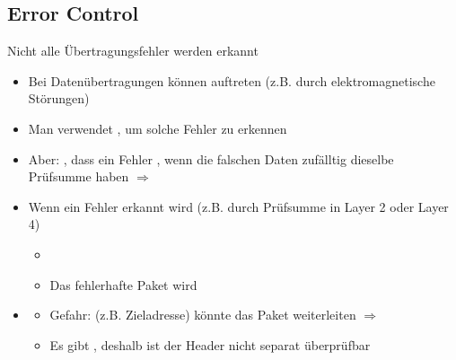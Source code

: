 \subsection{Error Control}
 Nicht alle Übertragungsfehler werden erkannt
\begin{itemize}
    \item Bei Datenübertragungen können  auftreten (z.B. durch elektromagnetische Störungen)
    \item Man verwendet , um solche Fehler zu erkennen
    \item Aber: , dass ein Fehler , wenn die falschen Daten zufälltig dieselbe Prüfsumme haben $\Rightarrow$ 
\end{itemize}
\begin{itemize}
    \item Wenn ein Fehler erkannt wird (z.B. durch Prüfsumme in Layer 2 oder Layer 4)
    \begin{itemize}
        \item {}
        \item Das fehlerhafte Paket wird 
    \end{itemize}
    \item {}
    \begin{itemize}
        \item Gefahr:  (z.B. Zieladresse) könnte das Paket  weiterleiten $\Rightarrow$ 
        \item Es gibt , deshalb ist der Header nicht separat überprüfbar
    \end{itemize}
\end{itemize}
